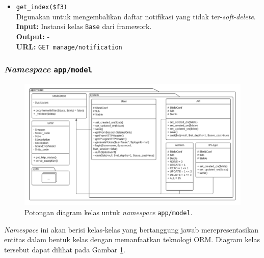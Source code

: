 \begin{itemize}
\begin{itemize}
                \item \texttt{get\_index(\$f3)} \\
                    Digunakan untuk mengembalikan daftar notifikasi yang tidak ter-\textit{soft-delete}.\\
                    \textbf{Input:} Instansi kelas \texttt{Base} dari framework.\\
                    \textbf{Output:} -\\
                    \textbf{URL:} \texttt{GET manage/notification}

            \end{itemize}
    \end{itemize}

\subsubsection{\textit{Namespace} \texttt{app/model}}
    \begin{figure}
        \centering
        \includegraphics[width=0.8\paperheight]{Gambar/classmap-be/Classmap - app-model.pdf}
        \caption{Potongan diagram kelas untuk \textit{namespace} \texttt{app/model}.}
        \label{fig:classmap_app-model}
    \end{figure}
    \textit{Namespace} ini akan berisi kelas-kelas yang bertanggung jawab merepresentasikan
    entitas dalam bentuk kelas dengan memanfaatkan teknologi ORM. Diagram kelas tersebut dapat dilihat pada 
    Gambar \ref{fig:classmap_app-model}.
    

